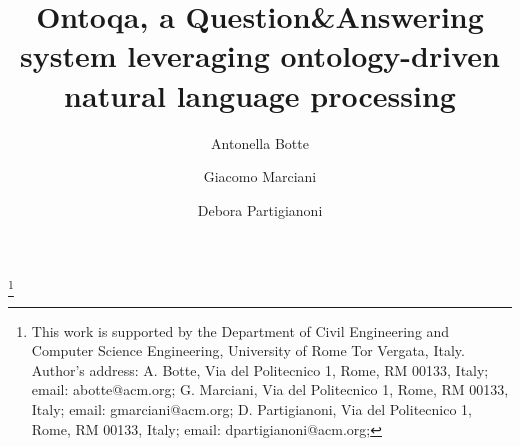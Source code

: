 \documentclass[acmlarge]{acmart}
\numberwithin{equation}{section}
\begin{document}
\title{Ontoqa, a Question\&Answering system leveraging ontology-driven natural language processing}
\author{Antonella Botte}
\author{Giacomo Marciani}
\author{Debora Partigianoni}




\thanks{
  This work is supported by the Department of Civil Engineering and Computer Science
  Engineering, University of Rome Tor Vergata, Italy.\\
  Author's address:
  A. Botte, Via del Politecnico 1, Rome, RM 00133, Italy;
  email: abotte@acm.org;
  G. Marciani, Via del Politecnico 1, Rome, RM 00133, Italy;
  email: gmarciani@acm.org;
  D. Partigianoni, Via del Politecnico 1, Rome, RM 00133, Italy;
  email: dpartigianoni@acm.org;
}

\maketitle

\renewcommand{\shortauthors}{A. Botte, G. Marciani and D. Partigianoni}
















\end{document}
